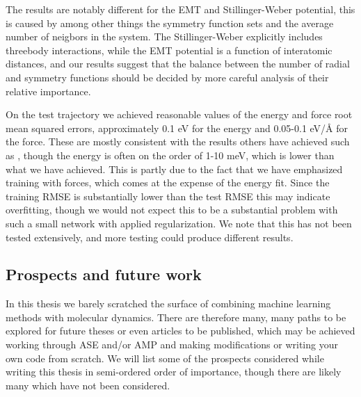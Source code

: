 The results are notably different for the EMT and Stillinger-Weber potential,
this is caused by among other things the symmetry function sets and the
average number of neigbors in the system.
The Stillinger-Weber explicitly includes threebody interactions,
while the EMT potential is a function of interatomic distances, and our
results suggest that the balance between the number of radial and symmetry functions
should be decided by more careful analysis of their relative importance.
\par
On the test trajectory we achieved reasonable values of the energy and force
root mean squared errors, approximately 0.1 eV for the energy and 0.05-0.1 eV/Å
for the force. These are mostly consistent with the results others have achieved
such as \cite{stende2017constructing}\cite{
    treider2017speeding}\cite{khorshidi2016amp}\cite{PhysRevLett.120.143001},
though the energy is often on the order of 1-10 meV, which is lower than
what we have achieved. This is partly due to the fact that we have emphasized
training with forces, which comes at the expense of the energy fit.
Since the training RMSE is substantially lower than the test RMSE this may
indicate overfitting, though we would not expect this to be a substantial problem
with such a small network with applied regularization.
We note that this has not been tested extensively,
and more testing could produce different results.

\subsection{Prospects and future work}
In this thesis we barely scratched the surface of combining machine learning
methods with molecular dynamics. There are therefore many, many paths
to be explored for future theses or even articles to be published,
which may be achieved working through ASE and/or AMP and making modifications
or writing your own code from scratch. We will list some of the prospects
considered while writing this thesis in semi-ordered order of importance,
though there are likely many which have not been considered.

